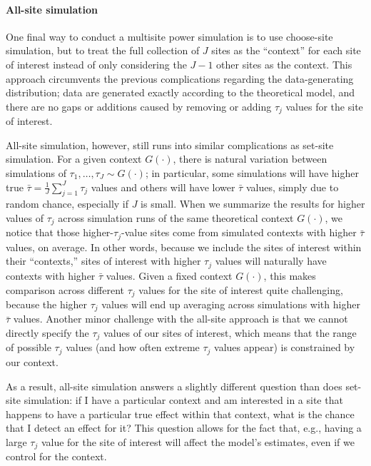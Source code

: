 \documentclass[]{article}
\begin{document}
\paragraph{All-site simulation} One final way to conduct a multisite power simulation is to use choose-site simulation, but to treat the full collection of $J$ sites as the ``context'' for each site of interest instead of only considering the $J-1$ other sites as the context.
This approach circumvents the previous complications regarding the data-generating distribution; data are generated exactly according to the theoretical model, and there are no gaps or additions caused by removing or adding $\tau_j$ values for the site of interest.

All-site simulation, however, still runs into similar complications as set-site simulation.
For a given context $G(\cdot)$, there is natural variation between simulations of $\tau_1, \dots, \tau_J \sim G(\cdot)$; in particular, some simulations will have higher true $\bar{\tau} = \frac{1}{J} \sum_{j=1}^J \tau_j$ values and others will have lower $\bar{\tau}$ values, simply due to random chance, especially if $J$ is small.
When we summarize the results for higher values of $\tau_j$ across simulation runs of the same theoretical context $G(\cdot)$, we notice that those higher-$\tau_j$-value sites come from simulated contexts with higher $\bar{\tau}$ values, on average.
In other words, because we include the sites of interest within their ``contexts,'' sites of interest with higher $\tau_j$ values will naturally have contexts with higher $\bar{\tau}$ values.
Given a fixed context $G(\cdot)$, this makes comparison across different $\tau_j$ values for the site of interest quite challenging, because the higher $\tau_j$ values will end up averaging across simulations with higher $\bar{\tau}$ values.
Another minor challenge with the all-site approach is that we cannot directly specify the $\tau_j$ values of our sites of interest, which means that the range of possible $\tau_j$ values (and how often extreme $\tau_j$ values appear) is constrained by our context.

As a result, all-site simulation answers a slightly different question than does set-site simulation: if I have a particular context and am interested in a site that happens to have a particular true effect within that context, what is the chance that I detect an effect for it?
This question allows for the fact that, e.g., having a large $\tau_j$ value for the site of interest will affect the model's estimates, even if we control for the context.
\end{document}
